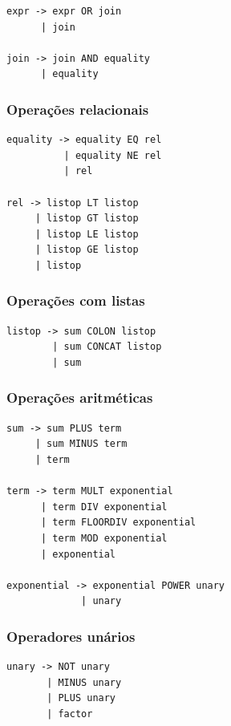 \documentclass[11pt,a4paper]{report}
\begin{document}
\begin{verbatim}
expr -> expr OR join
      | join

join -> join AND equality
      | equality
\end{verbatim}

\subsubsection{Operações relacionais}

\begin{verbatim}
equality -> equality EQ rel
          | equality NE rel
          | rel

rel -> listop LT listop
     | listop GT listop
     | listop LE listop
     | listop GE listop
     | listop
\end{verbatim}

\subsubsection{Operações com listas}

\begin{verbatim}
listop -> sum COLON listop
        | sum CONCAT listop
        | sum
\end{verbatim}

\subsubsection{Operações aritméticas}

\begin{verbatim}
sum -> sum PLUS term
     | sum MINUS term
     | term

term -> term MULT exponential
      | term DIV exponential
      | term FLOORDIV exponential
      | term MOD exponential
      | exponential

exponential -> exponential POWER unary
             | unary
\end{verbatim}

\subsubsection{Operadores unários}
\begin{verbatim}
unary -> NOT unary
       | MINUS unary
       | PLUS unary
       | factor
\end{verbatim}
\end{document}
